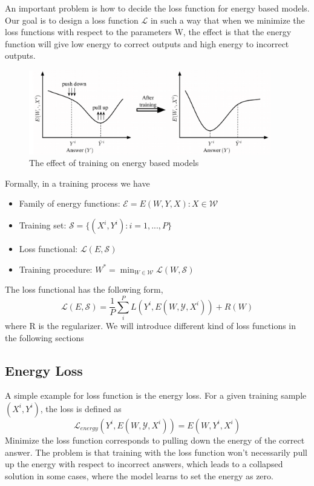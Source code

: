 An important problem is how to decide the loss function for energy based models.
Our goal is to design a loss function $\mathcal{L}$ in such a way that
when we minimize the loss functions with respect to the parameters W,
the effect is that the energy function will give low energy to correct outputs 
and high energy to incorrect outputs.\\

\begin{figure}[h]
    \centering
    \includegraphics[width=300pt]{lectures/08-a/images/ebm_train.png}
    \caption{The effect of training on energy based models}
    \label{fig:energy_based_models_training}
\end{figure}

Formally, in a training process we have
\begin{itemize}
    \item Family of energy functions: $\mathcal{E} = {E(W,Y,X):X \in \mathcal{W}}$
    \item Training set: $\mathcal{S} = \{(X^i, Y^i): i = 1,...,P \}$
    \item Loss functional: $\mathcal{L}(E, \mathcal{S})$
    \item Training procedure: $W^* = \min_{W \in \mathcal{W}} \mathcal{L}(W, \mathcal{S})$
\end{itemize}

The loss functional has the following form,
\[
    \mathcal{L}(E, \mathcal{S}) = \frac{1}{P} \sum_i^P L(Y^i, E(W, \mathcal{Y},X^i)) + R(W)    
\]
where R is the regularizer. We will introduce different kind of loss functions
in the following sections\\


\subsection{Energy Loss}

A simple example for loss function is the energy loss. For a given training sample
$(X^i,Y^i)$, the loss is defined as
\[
    \mathcal{L}_{energy}(Y^i, E(W, \mathcal{Y}, X^i)) = E(W, Y^i, X^i)    
\]
Minimize the loss function corresponds to pulling down the energy of 
the correct answer. The problem is that training with the loss function won't
necessarily pull up the energy with respect to incorrect answers, which 
leads to a collapsed solution in some cases, 
where the model learns to set the energy as zero. 

